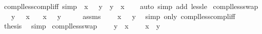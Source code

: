 \begin{isabellebody}
\ compl{\isacharunderscore}{\kern0pt}less{\isacharunderscore}{\kern0pt}compl{\isacharunderscore}{\kern0pt}iff\ {\isacharbrackleft}{\kern0pt}simp{\isacharbrackright}{\kern0pt}{\isacharcolon}{\kern0pt}\ {\isachardoublequoteopen}{\isacharminus}{\kern0pt}\ x\ {\isacharless}{\kern0pt}\ {\isacharminus}{\kern0pt}\ y\ {\isasymlongleftrightarrow}\ y\ {\isacharless}{\kern0pt}\ x{\isachardoublequoteclose}\isanewline
%
\isadelimproof
\ \ %
\endisadelimproof
%
\isatagproof
{}\isamarkupfalse%
\ {\isacharparenleft}{\kern0pt}auto\ simp\ add{\isacharcolon}{\kern0pt}\ less{\isacharunderscore}{\kern0pt}le{\isacharparenright}{\kern0pt}%
\endisatagproof
{\isafoldproof}%
%
\isadelimproof
\isanewline
%
\endisadelimproof
\isanewline
{}\isamarkupfalse%
\ compl{\isacharunderscore}{\kern0pt}less{\isacharunderscore}{\kern0pt}swap{}{\isacharcolon}{\kern0pt}\isanewline
\ \ \ {\isachardoublequoteopen}y\ {\isacharless}{\kern0pt}\ {\isacharminus}{\kern0pt}\ x{\isachardoublequoteclose}\isanewline
\ \ \ {\isachardoublequoteopen}x\ {\isacharless}{\kern0pt}\ {\isacharminus}{\kern0pt}\ y{\isachardoublequoteclose}\isanewline
%
\isadelimproof
%
\endisadelimproof
%
\isatagproof
{}\isamarkupfalse%
\ {\isacharminus}{\kern0pt}\isanewline
\ \ \isamarkupfalse%
\ assms\ \isamarkupfalse%
\ {\isachardoublequoteopen}{\isacharminus}{\kern0pt}\ {\isacharparenleft}{\kern0pt}{\isacharminus}{\kern0pt}\ x{\isacharparenright}{\kern0pt}\ {\isacharless}{\kern0pt}\ {\isacharminus}{\kern0pt}\ y{\isachardoublequoteclose}\ \isamarkupfalse%
\ {\isacharparenleft}{\kern0pt}simp\ only{\isacharcolon}{\kern0pt}\ compl{\isacharunderscore}{\kern0pt}less{\isacharunderscore}{\kern0pt}compl{\isacharunderscore}{\kern0pt}iff{\isacharparenright}{\kern0pt}\isanewline
\ \ \isamarkupfalse%
\ \isamarkupfalse%
\ {\isacharquery}{\kern0pt}thesis\ \isamarkupfalse%
\ simp\isanewline
{}\isamarkupfalse%
%
\endisatagproof
{\isafoldproof}%
%
\isadelimproof
\isanewline
%
\endisadelimproof
\isanewline
{}\isamarkupfalse%
\ compl{\isacharunderscore}{\kern0pt}less{\isacharunderscore}{\kern0pt}swap{}{\isacharcolon}{\kern0pt}\isanewline
\ \ \ {\isachardoublequoteopen}{\isacharminus}{\kern0pt}\ y\ {\isacharless}{\kern0pt}\ x{\isachardoublequoteclose}\isanewline
\ \ \ {\isachardoublequoteopen}{\isacharminus}{\kern0pt}\ x\ {\isacharless}{\kern0pt}\ y{\isachardoublequoteclose}\isanewline

\end{isabellebody}
